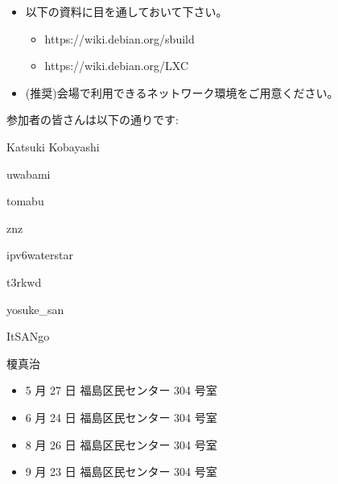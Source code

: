 \documentclass[mingoth,a4paper]{jsarticle}
\begin{document}

\begin{itemize}
	\item 以下の資料に目を通しておいて下さい。
	\begin{itemize}
		\item https://wiki.debian.org/sbuild
		\item https://wiki.debian.org/LXC
	\end{itemize}
	\item (推奨)会場で利用できるネットワーク環境をご用意ください。
\end{itemize}

参加者の皆さんは以下の通りです:
\begin{prework}{Katsuki Kobayashi}
\end{prework}

\begin{prework}{uwabami}
\end{prework}
 
\begin{prework}{tomabu}
\end{prework}
 
\begin{prework}{znz}
\end{prework}
 
\begin{prework}{ipv6waterstar}
\end{prework}
 
\begin{prework}{t3rkwd}
\end{prework}
 
\begin{prework}{yosuke\_san}
\end{prework}
 
\begin{prework}{ItSANgo}
\end{prework}
 
\begin{prework}{榎真治} 
\end{prework}


\clearpage


\begin{itemize}
	\item {5 月 27 日 福島区民センター 304 号室} 
	\item {6 月 24 日 福島区民センター 304 号室} 
	\item {8 月 26 日 福島区民センター 304 号室} 
	\item {9 月 23 日 福島区民センター 304 号室} 
\end{itemize}
\end{document}
